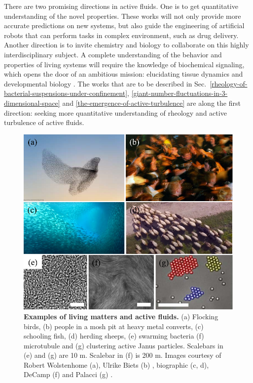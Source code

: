 There are two promising directions in active fluids. One is to get quantitative understanding of the novel properties.  These works will not only provide more accurate predictions on new systems, but also guide the engineering of artificial robots that can perform tasks in complex environment, such as drug delivery. Another direction is to invite chemistry and biology to collaborate on this highly interdisciplinary subject. A complete understanding of the behavior and properties of living systems will require the knowledge of biochemical signaling, which opens the door of an ambitious mission: elucidating tissue dynamics and developmental biology \cite{Marchetti2013, Curatolo2020}. The works that are to be described in Sec.~\ref{rheology-of-bacterial-suspensions-under-confinement},
\ref{giant-number-fluctuations-in-3-dimensional-space} and \ref{the-emergence-of-active-turbulence} are along the first direction: seeking more quantitative understanding of rheology and active turbulence of active fluids.

\begin{figure}[!htbp]
	\begin{center}
	\includegraphics[width=5.5 in]{Figs/1-Intro/1.pdf}
	\end{center}
	\caption[Figure 1.1: ]
	{
	\textbf{Examples of living matters and active fluids.}
  (a) Flocking birds, (b) people in a mosh pit at heavy metal converts, (c) schooling fish, (d) herding sheeps, (e) swarming bacteria (f) microtubule and (g) clustering active Janus particles.
  Scalebars in (e) and (g) are 10 \textmu m. Scalebar in (f) is 200 \textmu m. Images courtesy of Robert Wolstenhome (a), Ulrike Biets (b) \cite{Silverberg2013}, biographic (c, d), DeCamp (f) \cite{DeCamp2015} and Palacci (g) \cite{Palacci2013}.
	}
	\label{fig:1-1}
\end{figure}

